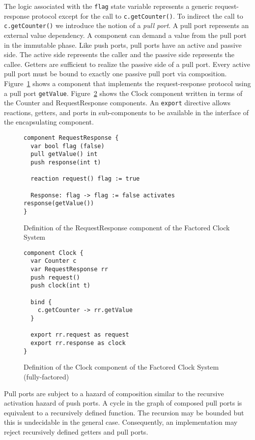 The logic associated with the \verb+flag+ state variable represents a generic request-response protocol except for the call to \verb+c.getCounter()+.
To indirect the call to \verb+c.getCounter()+ we introduce the notion of a \emph{pull port}.
A pull port represents an external value dependency.
A component can demand a value from the pull port in the immutable phase.
Like push ports, pull ports have an active and passive side.
The active side represents the caller and the passive side represents the callee.
Getters are sufficient to realize the passive side of a pull port.
Every active pull port must be bound to exactly one passive pull port via composition.
Figure~\ref{request_response_component} shows a component that implements the request-response protocol using a pull port \verb+getValue+.
Figure~\ref{factored2_clock_component} shows the Clock component written in terms of the Counter and RequestResponse components.
An \verb+export+ directive allows reactions, getters, and ports in sub-components to be available in the interface of the encapsulating component.

\begin{figure}
\begin{verbatim}
component RequestResponse {
  var bool flag (false)
  pull getValue() int
  push response(int t)

  reaction request() flag := true

  Response: flag -> flag := false activates response(getValue())
}
\end{verbatim}
\caption{Definition of the RequestResponse component of the Factored Clock System}
\label{request_response_component}
\end{figure}

\begin{figure}
\begin{verbatim}
component Clock {
  var Counter c
  var RequestResponse rr
  push request()
  push clock(int t)

  bind {
    c.getCounter -> rr.getValue
  }

  export rr.request as request
  export rr.response as clock
}
\end{verbatim}
\caption{Definition of the Clock component of the Factored Clock System (fully-factored)}
\label{factored2_clock_component}
\end{figure}

Pull ports are subject to a hazard of composition similar to the recursive activation hazard of push ports.
A cycle in the graph of composed pull ports is equivalent to a recursively defined function.
The recursion may be bounded but this is undecidable in the general case.
Consequently, an implementation may reject recursively defined getters and pull ports.

